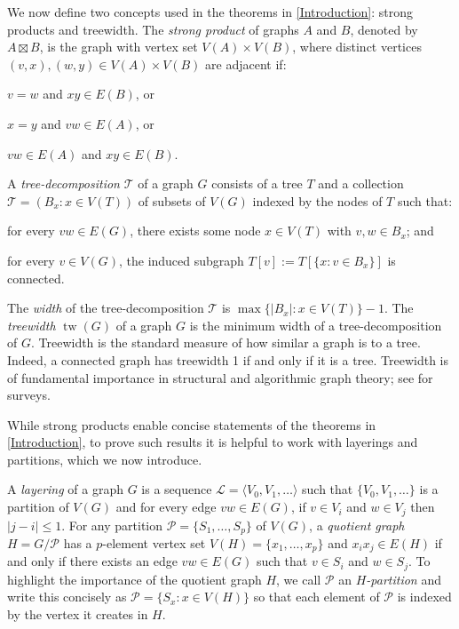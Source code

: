 \documentclass{patmorin}
\DeclareMathOperator{\tw}{tw}
\renewcommand{\leq}{\leqslant}
\begin{document}
We now define two concepts used in the theorems in \cref{Introduction}: strong products and treewidth. The \emph{strong product} of graphs $A$ and $B$, denoted by $A\boxtimes B$, is the graph with vertex set $V(A)\times V(B)$, where distinct vertices $(v,x),(w,y)\in V(A)\times V(B)$ are adjacent if: 
\begin{compactitem}
\item  $v=w$ and $xy\in E(B)$, or 
\item  $x=y$ and $vw\in E(A)$, or  
\item  $vw\in E(A)$ and $xy\in E(B)$. 
\end{compactitem}
A \emph{tree-decomposition} $\mathcal{T}$ of a graph $G$ consists of a tree $T$ and a collection $\mathcal{T}=(B_x:x\in V(T))$ of subsets of $V(G)$ indexed by the nodes of $T$ such that:
\begin{compactenum}[(i)]
\item for every $vw\in E(G)$, there exists some node $x\in V(T)$ with $v,w\in B_x$; and 
\item for every $v\in V(G)$, the induced subgraph $T[v] := T[\{x: v\in B_x\}]$ is connected.  
\end{compactenum}
The \emph{width} of the tree-decomposition $\mathcal{T}$ is $\max\{|B_x|:x\in V(T)\}-1$.  The \emph{treewidth} $\tw(G)$ of a graph $G$ is the minimum width of a tree-decomposition of $G$.  Treewidth is the standard measure of how similar a graph is to a tree. Indeed, a connected graph has treewidth 1 if and only if it is a tree. Treewidth is of fundamental importance in structural and algorithmic graph theory; see \citep{Reed03,HW17,Bodlaender-TCS98} for surveys. 

While strong products enable concise statements of the theorems in \cref{Introduction}, to prove such results it is helpful to work with layerings and partitions, which we now introduce. 

A \emph{layering} of a graph $G$ is a sequence $\mathcal{L}=\langle V_0,V_1,\ldots\rangle$ such that $\{V_0,V_1,\ldots\}$ is a partition of $V(G)$ and for every edge $vw\in E(G)$, if $v\in V_i$ and $w\in V_j$ then $|j-i|\leq 1$.  For any partition $\mathcal{P}=\{S_1,\ldots,S_p\}$ of $V(G)$, a \emph{quotient graph} $H=G/\mathcal{P}$ has a $p$-element vertex set $V(H)=\{x_1,\ldots,x_p\}$ and $x_ix_j\in E(H)$ if and only if there exists an edge $vw\in E(G)$ such that $v\in S_i$ and $w\in S_j$. To highlight the importance of the quotient graph $H$, we call $\mathcal{P}$ an \emph{$H$-partition} and write this concisely as $\mathcal{P}=\{S_x : x\in V(H)\}$ so that each element of $\mathcal{P}$ is indexed by the vertex it creates in $H$.  
\end{document}
